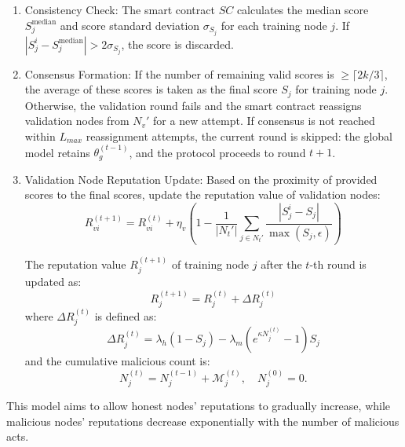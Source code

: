 \documentclass[a4paper]{cas-dc}
\begin{document}
\begin{enumerate}[1)]
\begin{enumerate}[a)]
		\item Calculate normalized severity scores. First compute the raw severity:
        		\begin{equation}
        			\tilde{S}_j^i = w_1(-Z_j^i) + w_2 s_j^i
        		\end{equation}
        		Then apply min--max normalization across all training nodes evaluated by $v_i$ in the current round and clip to $[0,1]$:
        		\begin{equation}
        			S_j^i = \frac{\tilde{S}_j^i - \min_{j'} \tilde{S}_{j'}^i}{\max_{j'} \tilde{S}_{j'}^i - \min_{j'} \tilde{S}_{j'}^i + \epsilon}
        		\end{equation}
	\end{enumerate}
	
	\item Consistency Check: The smart contract $SC$ calculates the median score $S_j^{\text{median}}$ and score standard deviation $\sigma_{S_j}$ for each training node $j$. If $|S_j^i - S_j^{\text{median}}| > 2\sigma_{S_j}$, the score is discarded.
	
	\item Consensus Formation: If the number of remaining valid scores is $\geq \lceil 2k/3 \rceil$, the average of these scores is taken as the final score $S_j$ for training node $j$. Otherwise, the validation round fails and the smart contract reassigns validation nodes from $N_v'$ for a new attempt. If consensus is not reached within $L_{max}$ reassignment attempts, the current round is skipped: the global model retains $\theta_g^{(t-1)}$, and the protocol proceeds to round $t+1$.
	
	\item Validation Node Reputation Update: Based on the proximity of provided scores to the final scores, update the reputation value of validation nodes:
	\begin{equation}
		R_{vi}^{(t+1)} = R_{vi}^{(t)} + \eta_v \left(1 - \frac{1}{|N_t'|}\sum_{j \in N_t'}\frac{|S_j^i - S_j|}{\max(S_j,\epsilon)}\right)
	\end{equation}
	
	\hspace*{1em} The reputation value $R_j^{(t+1)}$ of training node $j$ after the $t$-th round is updated as:
	\begin{equation}
		R_j^{(t+1)} = R_j^{(t)} + \Delta R_j^{(t)}
	\end{equation}
	where $\Delta R_j^{(t)}$ is defined as:
	\begin{equation}
		\Delta R_j^{(t)} = \lambda_h (1 - S_j) - \lambda_m (e^{\kappa N_j^{(t)}} - 1) S_j
	\end{equation}
	and the cumulative malicious count is:
	\begin{equation}
		N_j^{(t)} = N_j^{(t-1)} + \mathcal{M}_j^{(t)}, \quad N_j^{(0)}=0.
	\end{equation}
\end{enumerate}
\hspace*{1em} This model aims to allow honest nodes' reputations to gradually increase, while malicious nodes' reputations decrease exponentially with the number of malicious acts.
\end{document}
